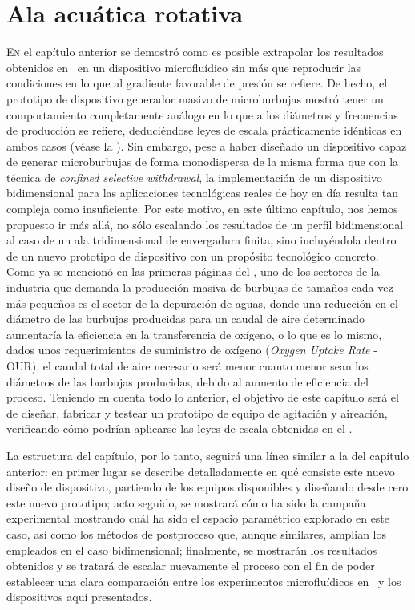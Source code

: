 \chapter{Ala acuática rotativa}
\pagestyle{esitscCD}
\epigraph{ }{}

\lettrine[lraise=-0.1, lines=2, loversize=0.25]{E}{n} el capítulo anterior se demostró como es posible extrapolar los resultados obtenidos en~\cite{Evangelio2015} en un dispositivo microfluídico sin más que reproducir las condiciones en lo que al gradiente favorable de presión se refiere. De hecho, el prototipo de dispositivo generador masivo de microburbujas mostró tener un comportamiento completamente análogo en lo que a los diámetros y frecuencias de producción se refiere, deduciéndose leyes de escala prácticamente idénticas en ambos casos (véase la ). Sin embargo, pese a haber diseñado un dispositivo capaz de generar microburbujas de forma monodispersa de la misma forma que con la técnica de \textit{confined selective withdrawal}, la implementación de un dispositivo bidimensional para las aplicaciones  tecnológicas reales de hoy en día  resulta tan compleja como insuficiente. Por este motivo, en este último capítulo, nos hemos propuesto ir más allá, no sólo escalando los resultados de un perfil bidimensional al caso de un ala tridimensional de envergadura finita, sino incluyéndola dentro de un nuevo prototipo de dispositivo con un propósito tecnológico concreto. Como ya se mencionó en las primeras páginas del , uno de los sectores de la industria que demanda la producción masiva de burbujas de tamaños cada vez más pequeños es el sector de la depuración de aguas, donde una reducción en el diámetro de las burbujas producidas para un caudal de aire determinado aumentaría la eficiencia en la transferencia de oxígeno, o lo que es lo mismo, dados unos requerimientos de suministro de oxígeno (\emph{Oxygen Uptake Rate} - OUR), el caudal total  de aire necesario será menor cuanto menor sean los diámetros de las burbujas producidas, debido al aumento de eficiencia del proceso. Teniendo en cuenta todo lo anterior, el objetivo de este capítulo será el de diseñar, fabricar y testear un prototipo de equipo de agitación y aireación, verificando cómo podrían aplicarse las leyes de escala obtenidas en el .

La estructura del capítulo, por lo tanto, seguirá una línea similar a la del capítulo anterior: en primer lugar se describe detalladamente en qué consiste este nuevo diseño de dispositivo, partiendo de los equipos disponibles y diseñando desde cero este nuevo prototipo; acto seguido, se mostrará cómo ha sido la campaña experimental mostrando cuál ha sido el espacio paramétrico explorado en este caso, así como los métodos de postproceso que, aunque similares, amplian los empleados en el caso bidimensional; finalmente, se mostrarán los resultados obtenidos y se tratará de escalar nuevamente el proceso con el fin de poder establecer una clara comparación entre los experimentos microfluídicos en~\cite{Evangelio2015} y los dispositivos aquí presentados.


